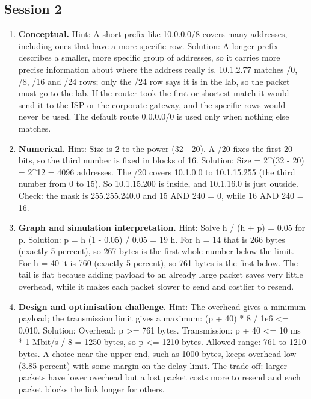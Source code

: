 \documentclass[11pt,a4paper]{article}
\begin{document}
\subsection*{Session 2}
\begin{enumerate}[nosep]
\item \textbf{Conceptual.} Hint: A short prefix like 10.0.0.0/8 covers many addresses, including ones that have a more specific row. Solution: A longer prefix describes a smaller, more specific group of addresses, so it carries more precise information about where the address really is. 10.1.2.77 matches /0, /8, /16 and /24 rows; only the /24 row says it is in the lab, so the packet must go to the lab. If the router took the first or shortest match it would send it to the ISP or the corporate gateway, and the specific rows would never be used. The default route 0.0.0.0/0 is used only when nothing else matches.
\item \textbf{Numerical.} Hint: Size is 2 to the power (32 - 20). A /20 fixes the first 20 bits, so the third number is fixed in blocks of 16. Solution: Size = 2\textasciicircum{}(32 - 20) = 2\textasciicircum{}12 = 4096 addresses. The /20 covers 10.1.0.0 to 10.1.15.255 (the third number from 0 to 15). So 10.1.15.200 is inside, and 10.1.16.0 is just outside. Check: the mask is 255.255.240.0 and 15 AND 240 = 0, while 16 AND 240 = 16.
\item \textbf{Graph and simulation interpretation.} Hint: Solve h / (h + p) = 0.05 for p. Solution: p = h (1 - 0.05) / 0.05 = 19 h. For h = 14 that is 266 bytes (exactly 5 percent), so 267 bytes is the first whole number below the limit. For h = 40 it is 760 (exactly 5 percent), so 761 bytes is the first below. The tail is flat because adding payload to an already large packet saves very little overhead, while it makes each packet slower to send and costlier to resend.
\item \textbf{Design and optimisation challenge.} Hint: The overhead gives a minimum payload; the transmission limit gives a maximum: (p + 40) * 8 / 1e6 \textless{}= 0.010. Solution: Overhead: p \textgreater{}= 761 bytes. Transmission: p + 40 \textless{}= 10 ms * 1 Mbit/s / 8 = 1250 bytes, so p \textless{}= 1210 bytes. Allowed range: 761 to 1210 bytes. A choice near the upper end, such as 1000 bytes, keeps overhead low (3.85 percent) with some margin on the delay limit. The trade-off: larger packets have lower overhead but a lost packet costs more to resend and each packet blocks the link longer for others.
\end{enumerate}
\end{document}
